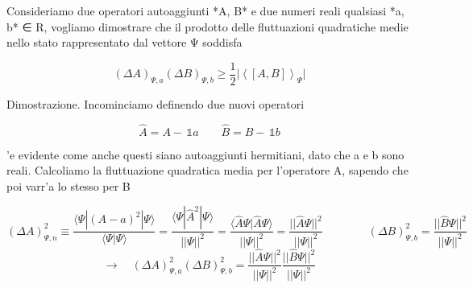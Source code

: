 Consideriamo due operatori autoaggiunti *A, B* e due numeri reali qualsiasi *a, b* ∈ R, vogliamo dimostrare che il prodotto delle fluttuazioni quadratiche medie nello stato rappresentato dal vettore Ψ soddisfa

$$(\Delta A)_{\Psi,a}(\Delta B)_{\Psi,b}\geq\frac{1}{2}\vert\left<[A,B]\right>_{\Psi}\vert$$

Dimostrazione. Incominciamo definendo due nuovi operatori

$$\hat{A}=A-\,\mathbb{1}a\qquad\hat{B}=B-\,\mathbb{1}b$$

'e evidente come anche questi siano autoaggiunti hermitiani, dato che a e b sono reali. Calcoliamo la fluttuazione quadratica media per l'operatore A, sapendo che poi varr'a lo stesso per B

$$(\Delta A)^{2}_{\Psi,n}\equiv\frac{\langle\Psi|(A-a)^{2}|\Psi\rangle}{\langle\Psi|\Psi\rangle}=\frac{\langle\Psi|\hat{A}^{2}|\Psi\rangle}{||\Psi||^{2}}=\frac{\langle\hat{A}\Psi|\hat{A}\Psi\rangle}{||\Psi||^{2}}=\frac{||\hat{A}\Psi||^{2}}{||\Psi||^{2}}\qquad\qquad(\Delta B)^{2}_{\Psi,b}=\frac{||\hat{B}\Psi||^{2}}{||\Psi||^{2}}$$  $$\longrightarrow\quad(\Delta A)^{2}_{\Psi,a}(\Delta B)^{2}_{\Psi,b}=\frac{||\hat{A}\Psi||^{2}}{||\Psi||^{2}}\frac{||\hat{B}\Psi||^{2}}{||\Psi||^{2}}$$  

